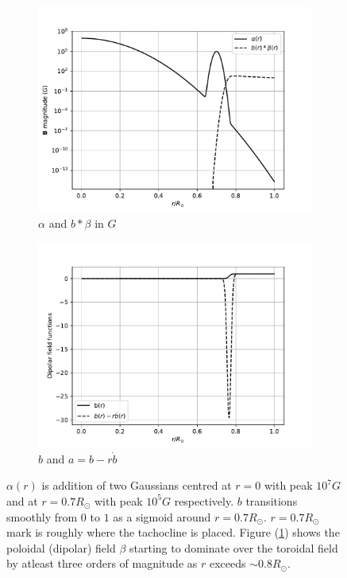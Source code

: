 \begin{figure}[t]
\begin{subfigure}{0.5\linewidth}
\centering
\includegraphics[scale=.5]{Chapter3/figs/alpha_beta}
\caption{$\alpha$ and $b * \beta$ in $G$}
\label{fig:alpha_beta}
\end{subfigure}
\begin{subfigure}{0.5\linewidth}
\centering
\includegraphics[scale=0.5,center]{Chapter3/figs/b}
\caption{$b$ and $a = b-r\dot{b}$}
\label{fig:a_b}
\end{subfigure}
\caption{$\alpha(r)$ is addition of two Gaussians centred at $r=0$ with peak $10^7 G$ and at $r=0.7R_{\odot}$ with peak $10^5 G$ respectively. $b$ transitions smoothly from $0$ to $1$ as a sigmoid around $r=0.7R_{\odot}$. $r=0.7R_{\odot}$ mark is roughly where the tachocline is placed. Figure (\ref{fig:alpha_beta}) shows the poloidal (dipolar) field $\beta$ starting to dominate over the toroidal field by atleast three orders of magnitude as $r$ exceeds $\sim 0.8 R_{\odot}$.}
\end{figure}

